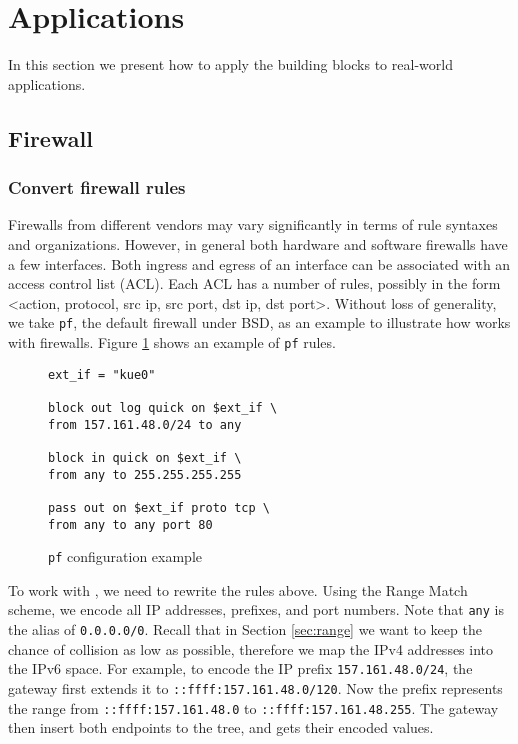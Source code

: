 \section{Applications}
In this section we present how to apply the building blocks to real-world applications.

\subsection{Firewall}\label{sec:firewall}
\subsubsection{Convert firewall rules}
Firewalls from different vendors may vary significantly in terms of rule syntaxes and organizations. However,
in general both hardware and software firewalls have a few interfaces. Both ingress and egress of an interface 
can be associated with an access control list (ACL). Each ACL has a number of rules, possibly in the form 
<action, protocol, src ip, src port, dst ip, dst port>. Without loss of generality, we take \texttt{pf}, the 
default firewall under BSD, as an example to illustrate how \sys works with firewalls. Figure \ref{fig:fwrule1} 
shows an example of \texttt{pf} rules. 

\begin{figure}[h]\label{fig:fwrule1}
\begin{lstlisting}[frame=single]
ext_if = "kue0"

block out log quick on $ext_if \
from 157.161.48.0/24 to any

block in quick on $ext_if \
from any to 255.255.255.255

pass out on $ext_if proto tcp \
from any to any port 80
\end{lstlisting}
\caption{\texttt{pf} configuration example}
\end{figure}

To work with \sys, we need to rewrite the rules above. Using the Range Match scheme, we encode all IP addresses, 
prefixes, and port numbers. Note that \texttt{any} is the alias of \texttt{0.0.0.0/0}. Recall that in Section \ref{sec:range}
we want to keep the chance of collision as low as possible, therefore we map the IPv4 addresses into the IPv6 space.
For example, to encode the IP prefix \texttt{157.161.48.0/24}, the gateway first extends it to \texttt{::ffff:157.161.48.0/120}.
Now the prefix represents the range from \texttt{::ffff:157.161.48.0} to \texttt{::ffff:157.161.48.255}. The gateway then insert
both endpoints to the tree, and gets their encoded values. 

